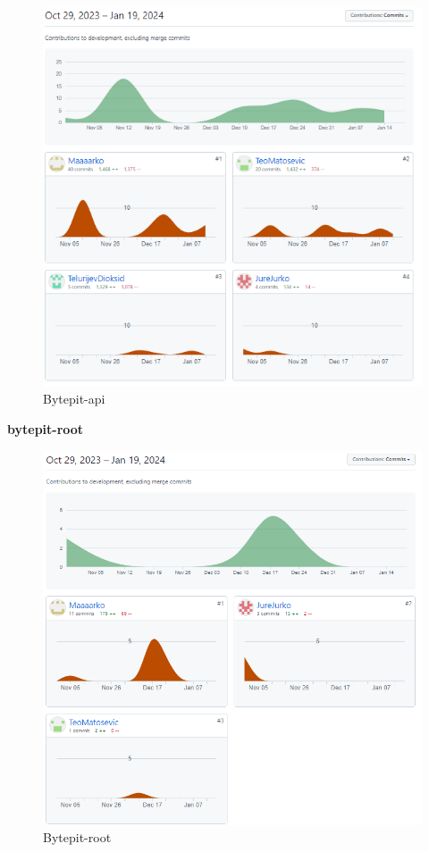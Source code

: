 \begin{packed_enum}
			\begin{figure}[H]
				\includegraphics[scale=1.0]{slike/bp-api-contr.PNG} 
				\centering
				\caption{Bytepit-api}
				\label{fig:bytepit-api}
			\end{figure}
			
			\eject
			
			\item \textbf{bytepit-root}
			
			\begin{figure}[H]
				\includegraphics[scale=0.9]{slike/bp-root-contr.PNG} 
				\centering
				\caption{Bytepit-root}
				\label{fig:bytepit-root}
			\end{figure}
		\end{packed_enum}
		
		  
		
	